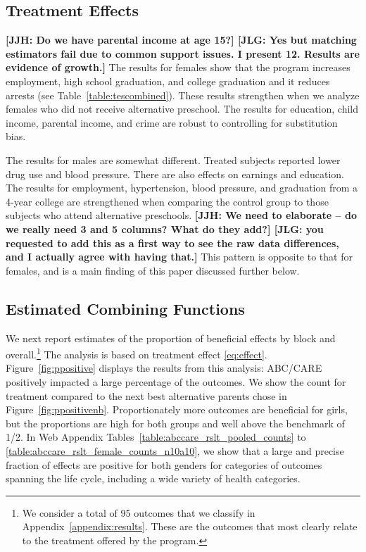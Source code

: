 \subsection{Treatment Effects}

\textbf{[JJH: Do we have parental income at age 15?] [JLG: Yes but matching estimators fail due to common support issues. I present 12. Results are evidence of growth.]}
The results for females show that the program increases employment, high school graduation, and college graduation and it reduces arrests (see Table~\ref{table:tescombined}). These results strengthen when we analyze females who did not receive alternative preschool. The results for education, child income, parental income, and crime are robust to controlling for substitution bias.

The results for males are somewhat different. Treated subjects reported lower drug use and blood pressure. There are also effects on earnings and education. The results for employment, hypertension, blood pressure, and graduation from a 4-year college are strengthened when comparing the control group to those subjects who attend alternative preschools. \textbf{[JJH: We need to elaborate -- do we really need 3 and 5 columns? What do they add?] [JLG: you requested to add this as a first way to see the raw data differences, and I actually agree with having that.]} This pattern is opposite to that for females, and is a main finding of this paper discussed further below.

\subsection{Estimated Combining Functions}

We next report estimates of the proportion of beneficial effects by block and overall.\footnote{We consider a total of 95 outcomes that we classify in Appendix~\ref{appendix:results}. These are the outcomes that most clearly relate to the treatment offered by the program.} The analysis is based on treatment effect \eqref{eq:effect}. Figure~\ref{fig:ppositive} displays the results from this analysis: ABC/CARE positively impacted a large percentage of the outcomes. We show the count for treatment compared to the next best alternative parents chose in Figure~\ref{fig:ppositivenb}. Proportionately more outcomes are beneficial for girls, but the proportions are high for both groups and well above the benchmark of 1/2. In Web Appendix Tables~\ref{table:abccare_rslt_pooled_counts} to \ref{table:abccare_rslt_female_counts_n10a10}, we show that a large and precise fraction of effects are positive for both genders for categories of outcomes spanning the life cycle, including a wide variety of health categories.

